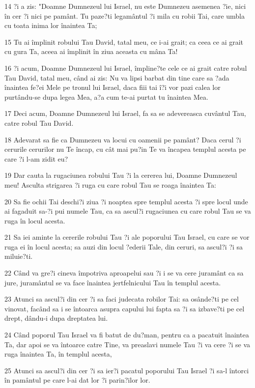 \par 14 ?i a zis: "Doamne Dumnezeul lui Israel, nu este Dumnezeu asemenea ?ie, nici în cer ?i nici pe pamânt. Tu paze?ti legamântul ?i mila cu robii Tai, care umbla cu toata inima lor înaintea Ta;
\par 15 Tu ai împlinit robului Tau David, tatal meu, ce i-ai grait; ca ceea ce ai grait cu gura Ta, aceea ai împlinit în ziua aceasta cu mâna Ta!
\par 16 ?i acum, Doamne Dumnezeul lui Israel, împline?te cele ce ai grait catre robul Tau David, tatal meu, când ai zis: Nu va lipsi barbat din tine care sa ?ada înaintea fe?ei Mele pe tronul lui Israel, daca fiii tai î?i vor pazi calea lor purtându-se dupa legea Mea, a?a cum te-ai purtat tu înaintea Mea.
\par 17 Deci acum, Doamne Dumnezeul lui Israel, fa sa se adevereasca cuvântul Tau, catre robul Tau David.
\par 18 Adevarat sa fie ca Dumnezeu va locui cu oamenii pe pamânt? Daca cerul ?i cerurile cerurilor nu Te încap, cu cât mai pu?in Te va încapea templul acesta pe care ?i l-am zidit eu?
\par 19 Dar cauta la rugaciunea robului Tau ?i la cererea lui, Doamne Dumnezeul meu! Asculta strigarea ?i ruga cu care robul Tau se roaga înaintea Ta:
\par 20 Sa fie ochii Tai deschi?i ziua ?i noaptea spre templul acesta ?i spre locul unde ai fagaduit sa-?i pui numele Tau, ca sa ascul?i rugaciunea cu care robul Tau se va ruga în locul acesta.
\par 21 Sa iei aminte la cererile robului Tau ?i ale poporului Tau Israel, cu care se vor ruga ei în locul acesta; sa auzi din locul ?ederii Tale, din ceruri, sa ascul?i ?i sa miluie?ti.
\par 22 Când va gre?i cineva împotriva aproapelui sau ?i i se va cere juramânt ca sa jure, juramântul se va face înaintea jertfelnicului Tau în templul acesta.
\par 23 Atunci sa ascul?i din cer ?i sa faci judecata robilor Tai: sa osânde?ti pe cel vinovat, facând sa i se întoarca asupra capului lui fapta sa ?i sa izbave?ti pe cel drept, dându-i dupa dreptatea lui.
\par 24 Când poporul Tau Israel va fi batut de du?man, pentru ca a pacatuit înaintea Ta, dar apoi se va întoarce catre Tine, va preaslavi numele Tau ?i va cere ?i se va ruga înaintea Ta, în templul acesta,
\par 25 Atunci sa ascul?i din cer ?i sa ier?i pacatul poporului Tau Israel ?i sa-l întorci în pamântul pe care l-ai dat lor ?i parin?ilor lor.
